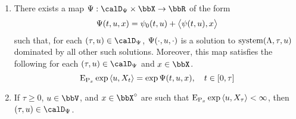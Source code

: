 \begin{theorem}
  \label{theorem:KM}
  \begin{enumerate}[label=(\alph*)]
    \item
      \label{theorem:KM:1}
      There exists a map $\aff: \momentSpace \times \stateSpace \rightarrow \bbR$ of the form
      \begin{equation*}
        \Psi(t,u,x) = \psi_0(t,u) + {\big\langle \psi(t,u) , x \big\rangle}
      \end{equation*}
      such that, for each $(\tau,\momentVar) \in \momentSpace$, $\Psi(\cdot,u,\cdot)$ is a solution to $\operatorname{system}(\Lambda,\tau,u)$ dominated by all other such solutions.
      Moreover, this map satisfies the following for each $(\tau, \momentVar) \in \momentSpace$ and $\stateVar \in \stateSpace$.
      \begin{equation}
        \label{theorem:KM-moments}
        {\operatorname{E}}_{{\operatorname{P}}_x}\exp{\langle u, X_t \rangle} = \exp\Psi(t, u, x), \quad t \in [0,\tau]
      \end{equation}
    \item
      \label{theorem:KM:2}
      If $\tau \geq 0$, $\momentVar \in \vecSpace$, and $\stateVar \in \stateSpace^\circ$ are such that  ${\operatorname{E}}_{{\operatorname{P}}_x}\exp{\langle u, X_\tau \rangle} < \infty$, then $(\tau, \momentVar) \in \momentSpace$.
  \end{enumerate}
\end{theorem}
